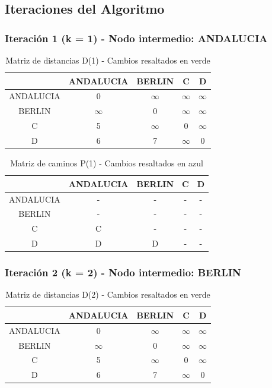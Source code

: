 \documentclass[12pt]{article}
\begin{document}
\clearpage
\subsection{Iteraciones del Algoritmo}
\subsubsection{Iteración 1 (k = 1) - Nodo intermedio: ANDALUCIA}
\begin{table}[h!]
\centering
\begin{tabular}{|c|c|c|c|c|}
\hline
 & ANDALUCIA & BERLIN & C & D \\\hline
ANDALUCIA & 0 & $\infty$ & $\infty$ & $\infty$ \\\hline
BERLIN & $\infty$ & 0 & $\infty$ & $\infty$ \\\hline
C & 5 & $\infty$ & 0 & $\infty$ \\\hline
D & 6 & 7 & $\infty$ & 0 \\\hline
\end{tabular}
\caption{Matriz de distancias D(1) - Cambios resaltados en verde}
\end{table}

\begin{table}[h!]
\centering
\begin{tabular}{|c|c|c|c|c|}
\hline
 & ANDALUCIA & BERLIN & C & D \\\hline
ANDALUCIA & - & - & - & - \\\hline
BERLIN & - & - & - & - \\\hline
C & C & - & - & - \\\hline
D & D & D & - & - \\\hline
\end{tabular}
\caption{Matriz de caminos P(1) - Cambios resaltados en azul}
\end{table}

\subsubsection{Iteración 2 (k = 2) - Nodo intermedio: BERLIN}
\begin{table}[h!]
\centering
\begin{tabular}{|c|c|c|c|c|}
\hline
 & ANDALUCIA & BERLIN & C & D \\\hline
ANDALUCIA & 0 & $\infty$ & $\infty$ & $\infty$ \\\hline
BERLIN & $\infty$ & 0 & $\infty$ & $\infty$ \\\hline
C & 5 & $\infty$ & 0 & $\infty$ \\\hline
D & 6 & 7 & $\infty$ & 0 \\\hline
\end{tabular}
\caption{Matriz de distancias D(2) - Cambios resaltados en verde}
\end{table}
\end{document}
